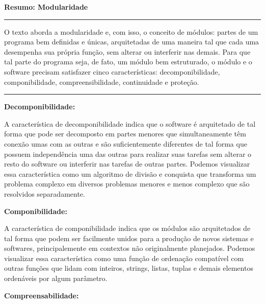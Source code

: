\documentclass{article}
\begin{document}
\begin{center}

    \vspace*{-8mm}
    \textbf{\large{Resumo: Modularidade}}
    \vspace*{-4.8mm}

\end{center}

\noindent\rule{\textwidth}{0.5pt}

\bigskip

O texto aborda a modularidade e, com isso, o conceito de módulos: partes de um programa bem definidas e únicas, arquitetadas de uma maneira tal que cada uma desempenha sua própria função, sem alterar ou interferir nas demais. Para que tal parte do programa seja, de fato, um módulo bem estruturado, o módulo e o software precisam satisfazer cinco características: decomponibilidade, componibilidade, compreensibilidade, continuidade e proteção.

\bigskip

\noindent\rule{\textwidth}{0.5pt}

\bigskip

\textbf{Decomponibilidade:}

\medskip

A característica de decomponibilidade indica que o software é arquitetado de tal forma que pode ser decomposto em partes menores que simultaneamente têm conexão umas com as outras e são suficientemente diferentes de tal forma que possuem independência uma das outras para realizar suas tarefas sem alterar o resto do software ou interferir nas tarefas de outras partes. Podemos visualizar essa característica como um algoritmo de divisão e conquista que transforma um problema complexo em diversos problemas menores e menos complexo que são resolvidos separadamente.

\medskip

\textbf{Componibilidade:}

\medskip

A característica de componibilidade indica que os módulos são arquitetados de tal forma que podem ser facilmente unidos para a produção de novos sistemas e softwares, principalemente em contextos não originalmente planejados. Podemos visualizar essa característica como uma função de ordenação compatível com outras funções que lidam com inteiros, strings, listas, tuplas e demais elementos ordenáveis por algum parâmetro.

\medskip

\textbf{Compreensabilidade:}
\end{document}
